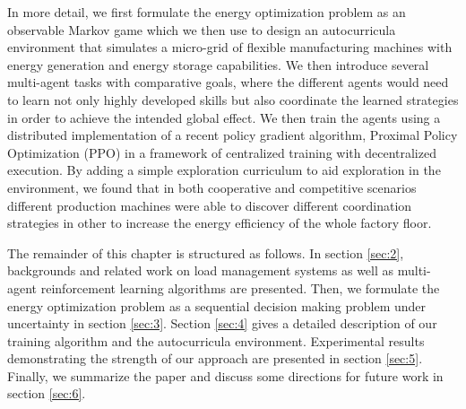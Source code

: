In more detail, we first formulate the energy optimization problem as an observable Markov game which we then use to design an autocurricula environment that simulates a micro-grid of flexible manufacturing machines with energy generation and energy storage capabilities. We then introduce several multi-agent tasks with comparative goals, where the different agents would need to learn not only highly developed skills but also coordinate the learned strategies in order to achieve the intended global effect. We then train the agents using a distributed implementation of a recent policy gradient algorithm, Proximal Policy Optimization (PPO) \cite{schulman2017proximal} in a framework of centralized training with decentralized execution. By adding a simple exploration curriculum to aid exploration in the environment, we found that in both cooperative and competitive scenarios different production machines were able to discover different coordination strategies in other to increase the energy efficiency of the whole factory floor.

The remainder of this chapter is structured as follows. In section \ref{sec:2}, backgrounds and related work on load management systems as well as multi-agent reinforcement learning algorithms are presented. Then, we formulate the energy optimization problem as a sequential decision making problem under uncertainty in section \ref{sec:3}. Section \ref{sec:4} gives a detailed description of our training algorithm and the autocurricula environment. Experimental results demonstrating the strength of our approach are presented in section \ref{sec:5}. Finally, we summarize the paper and discuss some directions for future work in section \ref{sec:6}.
